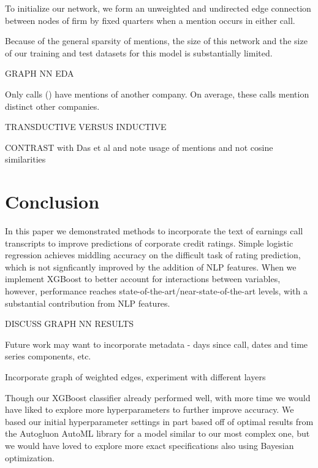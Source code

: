 \documentclass{article}[11pt]
\begin{document}

    To initialize our network, we form an unweighted and undirected edge connection between nodes of firm by fixed quarters when a mention occurs in either call.

    Because of the general sparsity of mentions, the size of this network and the size of our training and test datasets for this model is substantially limited.

    GRAPH NN EDA

    Only \noCallsWithNonSelfMentions \space calls (\shareCallsWithNonSelfMentions) have mentions of another company. On average, these calls mention \avgDistinctNonSelfCompaniesMentionedNoZero \space distinct other companies.

    TRANSDUCTIVE VERSUS INDUCTIVE

    CONTRAST with Das et al \cite{das_credit_2023} and note usage of mentions and not cosine similarities

    \section*{Conclusion}

    In this paper we demonstrated methods to incorporate the text of earnings call transcripts to improve predictions of corporate credit ratings. Simple logistic regression achieves middling accuracy on the difficult task of rating prediction, which is not signficantly improved by the addition of NLP features. When we implement XGBoost to better account for interactions between variables, however, performance reaches state-of-the-art/near-state-of-the-art levels, with a substantial contribution from NLP features.

    DISCUSS GRAPH NN RESULTS

    Future work may want to incorporate metadata - days since call, dates and time series components, etc.

    Incorporate graph of weighted edges, experiment with different layers

    Though our XGBoost classifier already performed well, with more time we would have liked to explore more hyperparameters to further improve accuracy. We based our initial hyperparameter settings in part based off of optimal results from the Autogluon AutoML library \citep{erickson_autogluon_2024} for a model similar to our most complex one, but we would have loved to explore more exact specifications also using Bayesian optimization.
\end{document}
